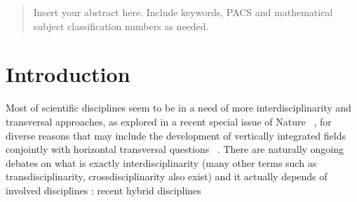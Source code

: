 
\author{Juste Raimbault}



\date{Received: date / Accepted: date}



\maketitle

\begin{abstract}
Insert your abstract here. Include keywords, PACS and mathematical
subject classification numbers as needed.
\end{abstract}

\section{Introduction}
\label{sec:intro}

Most of scientific disciplines seem to be in a need of more interdisciplinarity and transversal approaches, as explored in a recent special issue of Nature~\cite{} %
, for diverse reasons that may include the development of vertically integrated fields conjointly with horizontal transversal questions~\cite{} %
. There are naturally ongoing debates on what is exactly interdisciplinarity (many other terms such as transdisciplinarity, crossdisciplinarity also exist) and it actually depends of involved disciplines : recent hybrid disciplines %




